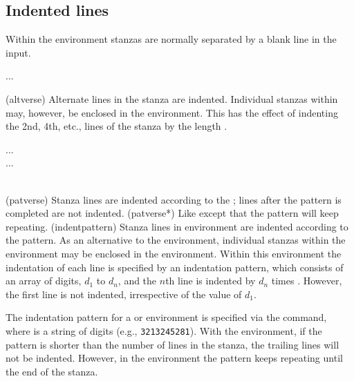 \subsection{Indented lines}

Within the  environment stanzas are normally separated by a 
blank line in the input. 

\begin{syntax}
 ...  \\
\end{syntax}
\glossary(altverse)%
  {}%
  {Alternate lines in the stanza are indented.}
Individual stanzas within  may, however, 
be enclosed in the  
environment. This has the effect of
indenting the 2nd, 4th, etc., lines of the stanza by the length \lnc{\vgap}.

\begin{syntax}
 ...  \\
 ...  \\
\cmd{\indentpattern} \\
\end{syntax}
\glossary(patverse)%
  {}%
  {Stanza lines are indented according to the ;
   lines after the pattern is completed are not indented.}
\glossary(patverse*)%
  {}%
  {Like  except that the pattern will keep repeating.}
\glossary(indentpattern)%
  {}%
  {Stanza lines in  environment are indented according to
   the  pattern.}
As an alternative to the  environment, 
individual stanzas within the  environment may be enclosed
in the  environment. Within this environment the indentation
of each line is specified by an indentation 
pattern, which consists
of an array of digits, \(d_{1}\) to \(d_{n}\), and the \(n\)th line is
indented by \(d_{n}\) times \lnc{\vgap}. However, the first line is
not indented, irrespective of the value of \(d_{1}\).

    The indentation pattern for a  or 
environment is specified
via the \cmd{\indentpattern} command, where  is a string
of digits (e.g., \texttt{3213245281}). With the 
environment, if the pattern is
shorter than the number of lines in the stanza, the trailing lines will
not be indented. However, in the  environment the pattern
keeps repeating until the end of the stanza.

